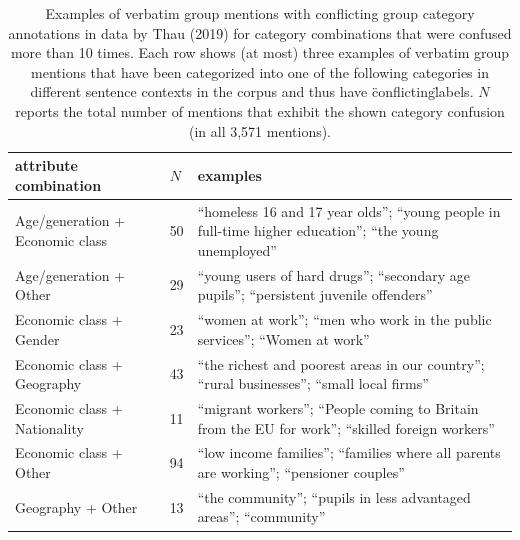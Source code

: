 \begin{table}[!th]
\centering
\caption{Examples of verbatim group mentions with conflicting group category annotations in data by Thau (2019) for category combinations that were confused more than 10 times. Each row shows (at most) three examples of verbatim group mentions that have been categorized into one of the following categories in different sentence contexts in the corpus and thus have \"conflicting\" labels. $N$ reports the total number of mentions that exhibit the shown category confusion (in all 3,571 mentions).}
\label{tableC05}
\begin{tabular}{p{2.2in} l p{3in}}
\toprule
attribute combination & $N$ & examples \\
\midrule
Age/generation + Economic class & 50 & ``homeless 16 and 17 year olds''; ``young people in full-time higher education''; ``the young unemployed'' \\
Age/generation + Other & 29 & ``young users of hard drugs''; ``secondary age pupils''; ``persistent juvenile offenders'' \\
Economic class + Gender & 23 & ``women at work''; ``men who work in the public services''; ``Women at work'' \\
Economic class + Geography & 43 & ``the richest and poorest areas in our country''; ``rural businesses''; ``small local firms'' \\
Economic class + Nationality & 11 & ``migrant workers''; ``People coming to Britain from the EU for work''; ``skilled foreign workers'' \\
Economic class + Other & 94 & ``low income families''; ``families where all parents are working''; ``pensioner couples'' \\
Geography + Other & 13 & ``the community''; ``pupils in less advantaged areas''; ``community'' \\
\bottomrule
\end{tabular}
\end{table}
